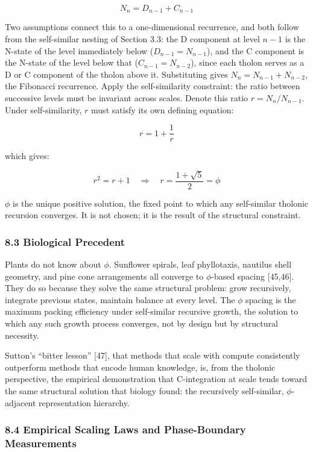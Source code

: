 \documentclass[
  11pt,
  letterpaper,
]{article}
\begin{document}
\[N_n = D_{n-1} + C_{n-1}\]

Two assumptions connect this to a one-dimensional recurrence, and both
follow from the self-similar nesting of Section 3.3: the D component at
level \(n-1\) is the N-state of the level immediately below
(\(D_{n-1} = N_{n-1}\)), and the C component is the N-state of the level
below that (\(C_{n-1} = N_{n-2}\)), since each tholon serves as a D or C
component of the tholon above it. Substituting gives
\(N_n = N_{n-1} + N_{n-2}\), the Fibonacci recurrence. Apply the
self-similarity constraint: the ratio between successive levels must be
invariant across scales. Denote this ratio \(r = N_n / N_{n-1}\). Under
self-similarity, \(r\) must satisfy its own defining equation:

\[r = 1 + \frac{1}{r}\]

which gives:

\[r^2 = r + 1 \quad \Longrightarrow \quad r = \frac{1 + \sqrt{5}}{2} = \phi\]

\(\phi\) is the unique positive solution, the fixed point to which any
self-similar tholonic recursion converges. It is not chosen; it is the
result of the structural constraint.

\subsubsection{8.3 Biological Precedent}\label{biological-precedent}

Plants do not know about \(\phi\). Sunflower spirals, leaf phyllotaxis,
nautilus shell geometry, and pine cone arrangements all converge to
\(\phi\)-based spacing {[}45,46{]}. They do so because they solve the
same structural problem: grow recursively, integrate previous states,
maintain balance at every level. The \(\phi\) spacing is the maximum
packing efficiency under self-similar recursive growth, the solution to
which any such growth process converges, not by design but by structural
necessity.

Sutton's ``bitter lesson'' {[}47{]}, that methods that scale with
compute consistently outperform methods that encode human knowledge, is,
from the tholonic perspective, the empirical demonstration that
C-integration at scale tends toward the same structural solution that
biology found: the recursively self-similar, \(\phi\)-adjacent
representation hierarchy.

\subsubsection{8.4 Empirical Scaling Laws and Phase-Boundary
Measurements}\label{empirical-scaling-laws-and-phase-boundary-measurements}
\end{document}
